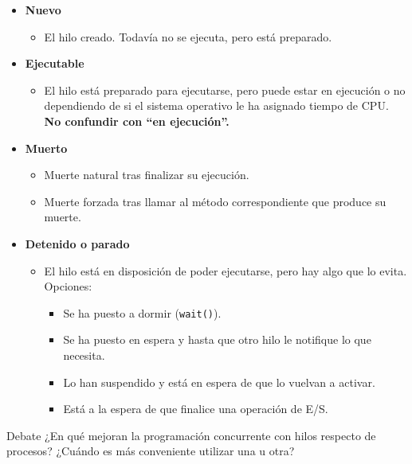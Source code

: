 \documentclass{beamer}
\begin{document}
\begin{frame}
    \begin{itemize}
    \item \textbf{Nuevo}
        \begin{itemize}
        \item El hilo creado. Todavía no se ejecuta, pero está preparado.
        \end{itemize}

    \item \textbf{Ejecutable}
        \begin{itemize}
        \item El hilo está preparado para ejecutarse, pero puede estar en ejecución o no dependiendo de si
        el sistema operativo le ha asignado tiempo de CPU. \textbf{No confundir con “en ejecución”.}
        \end{itemize}

    \item \textbf{Muerto}
        \begin{itemize}
        \item Muerte natural tras finalizar su ejecución.
        \item Muerte forzada tras llamar al método correspondiente que produce su muerte.
        \end{itemize}

    \item \textbf{Detenido o parado}
        \begin{itemize}
        \item El hilo está en disposición de poder ejecutarse, pero hay algo que lo evita. Opciones:
        \begin{itemize}
        \item Se ha puesto a dormir (\texttt{wait()}).
        \item Se ha puesto en espera y hasta que otro hilo le notifique lo que necesita.
        \item Lo han suspendido y está en espera de que lo vuelvan a activar.
        \item Está a la espera de que finalice una operación de E/S. 
        \end{itemize}
        \end{itemize}
    \end{itemize}
\end{frame}

\begin{frame}{Debate}
\centering\Large{¿En qué mejoran la programación concurrente con hilos respecto de procesos? ¿Cuándo es más conveniente utilizar una u otra?}
\end{frame}
\end{document}
